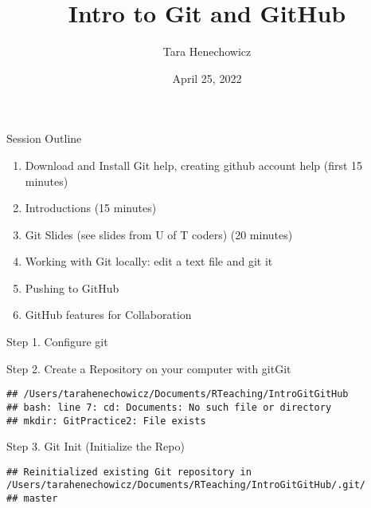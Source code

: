 \documentclass[ignorenonframetext,]{beamer}
\title{Intro to Git and GitHub}
\author{Tara Henechowicz}
\date{April 25, 2022}
\providecommand{\tightlist}{%
  \setlength{\itemsep}{0pt}\setlength{\parskip}{0pt}}
\begin{document}
\frame{\titlepage}

\begin{frame}{Session Outline}

\begin{enumerate}
\def\labelenumi{\arabic{enumi}.}
\tightlist
\item
  Download and Install Git help, creating github account help (first 15
  minutes)
\item
  Introductions (15 minutes)
\item
  Git Slides (see slides from U of T coders) (20 minutes)
\item
  Working with Git locally: edit a text file and git it
\item
  Pushing to GitHub
\item
  GitHub features for Collaboration
\end{enumerate}

\end{frame}

\begin{frame}{Step 1. Configure git}

\end{frame}

\begin{frame}[fragile]{Step 2. Create a Repository on your computer with
gitGit}

\begin{verbatim}
## /Users/tarahenechowicz/Documents/RTeaching/IntroGitGitHub
## bash: line 7: cd: Documents: No such file or directory
## mkdir: GitPractice2: File exists
\end{verbatim}

\end{frame}

\begin{frame}[fragile]{Step 3. Git Init (Initialize the Repo)}

\begin{verbatim}
## Reinitialized existing Git repository in /Users/tarahenechowicz/Documents/RTeaching/IntroGitGitHub/.git/
## master
\end{verbatim}

\end{frame}
\end{document}
